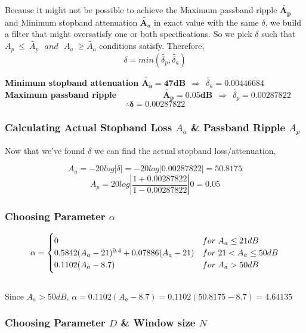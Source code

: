 \documentclass[11pt]{article}
\begin{document}
Because it might not be possible to achieve the {Maximum passband ripple $\mathbf{\tilde{A_p}}$} and {Minimum stopband attenuation $\mathbf{\tilde{A_a}}$} in exact value
with the same $\delta$, we build a filter that might oversatisfy one or both specifications. 
So we pick $\delta$ such that $A_{p} \ \leqslant \ \tilde{A_{p}} \ \ \ and\ \ \ A_{a} \ \geqslant \tilde{A_{a}}$ conditions satisfy. Therefore,
$$\delta = min\left(\tilde{\delta_p},\tilde{\delta_a}\right)$$

{\color{ultramarine} \bf Minimum stopband attenuation $\mathbf{\tilde{A_a} = 47 dB} \ \ \Rightarrow \ \ \tilde{\delta _{a}}= 0.00446684 $}\\
{\color{ultramarine} \bf Maximum passband ripple \ \ \ \ \  \ \ \ \ $\mathbf{\tilde{A_p} = 0.05 dB} \ \ \Rightarrow \ \ \tilde{\delta _{p}}= 0.00287822$} 
{\color{ultramarine} $$\mathbf{\therefore \delta = 0.00287822}$$}

\subsubsection{Calculating Actual Stopband Loss $A_a$ \& Passband Ripple $A_p$}
Now that we've found $\delta$ we can find the actual stopband loss/attenuation,

{\color{ultramarine} $$A_{a} =-20log|\delta | = -20log|0.00287822| = 50.8175 $$}
{\color{ultramarine}$$A_{p} =20log|\frac{1+0.00287822 }{1-0.00287822 }|0  = 0.05 $$}
\subsubsection{Choosing Parameter $\alpha$}
\[
    \alpha = \begin{cases}
    0 & for \hspace*{3pt} A_a \leq 21 dB \\
    0.5842(A_a - 21)^{0.4} + 0.07886(A_a - 21) & for \hspace*{3pt} 21 < A_a \leq 50 dB \\
    0.1102(A_a - 8.7) & for \hspace*{3pt} A_a > 50 dB
   \end{cases}
   \]\\

   {\color{ultramarine} Since $A_a>50dB$, $\alpha = 0.1102(A_a - 8.7) = 0.1102(50.8175 - 8.7) = 4.64135$}
  

\subsubsection{Choosing Parameter $D$ \& Window size $N$}
\end{document}
